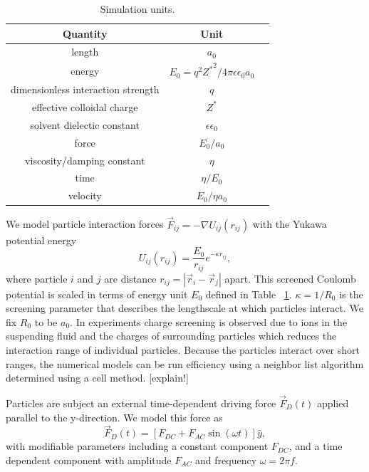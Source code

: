 \documentclass[twocolumn,preprintnumbers,amsmath,amssymb,aps,prx]{revtex4}
\begin{document}
\begin{table}[h!]
\centering
\caption{Simulation units.}
\begin{ruledtabular}
\begin{tabular}{c c p{5cm}}
Quantity & Unit \\
\hline
length &  $a_0$ \\
energy & $E_0 = q^2{Z^*}^2/4\pi \epsilon \epsilon_0 a_0$ \\
dimensionless interaction strength & $q$ \\
effective colloidal charge & $Z^*$ \\
solvent dielectic constant & $\epsilon \epsilon_0$\\
force & $E_0 / a_0$\\
viscosity/damping constant & $\eta$ \\
time &  $\eta / E_0$ \\
velocity &  $ E_0 / \eta a_0$ \\
\end{tabular}
\end{ruledtabular}
\label{tab:1}
\end{table}

We model particle interaction forces
$\vec{F}_{ij} = -\nabla U_{ij}(r_{ij})$ 
with
the Yukawa potential energy 
\begin{equation}
  U_{ij}(r_{ij}) = \frac{E_0}{r_{ij}} e^{-\kappa r_{ij}},
\end{equation}
where particle $i$ and $j$ are distance
$r_{ij} = |\vec{r}_i - \vec{r}_j|$ apart.
This 
screened Coulomb potential
is scaled in terms of energy unit $E_0$
defined in Table ~\ref{tab:1}.
$\kappa = 1/R_0$ is the screening parameter 
that describes the lengthscale at
which particles interact.
We fix $R_0$ to be $a_0$.
In experiments charge screening is observed
due to ions in the suspending fluid and
the charges of surrounding particles
which
reduces the interaction range of individual particles. %
Because the particles interact over short ranges, 
the numerical models can be run efficiency
using a neighbor list algorithm
determined using a cell method.
[explain!]

Particles are subject an external time-dependent driving force
$\vec{F}_{D}(t)$
applied parallel to the y-direction.
We model this force as
\begin{equation}
\vec{F}_{D}(t) = [F_{DC} + F_{AC} \sin(\omega t)] \hat{y},
\end{equation}
with modifiable parameters including
a constant component $F_{DC}$,
and a time dependent component with amplitude $F_{AC}$
and frequency $\omega = 2 \pi f$.
\end{document}
